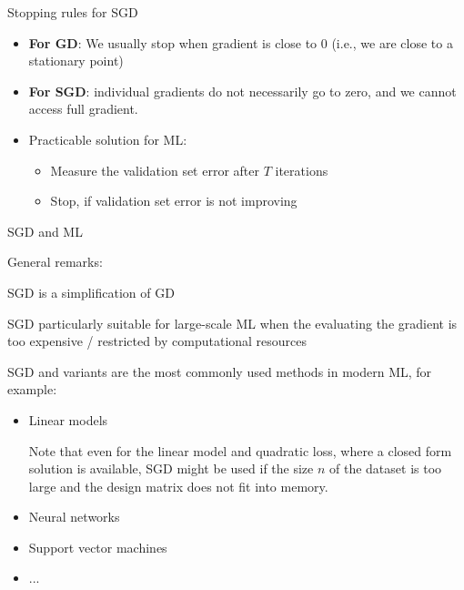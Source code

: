 \documentclass[11pt,compress,t,notes=noshow, xcolor=table]{beamer}
\begin{document}
\begin{vbframe}{Stopping rules for SGD} 

\begin{itemize}
	\item \textbf{For GD}: We usually stop when gradient is close to $0$ (i.e., we are close to a stationary point)
	\item \textbf{For SGD}: individual gradients do not necessarily go to zero, and we cannot access full gradient.
	\item Practicable solution for ML: 
	\begin{itemize}
		\item Measure the validation set error after $T$ iterations
		\item Stop, if validation set error is not improving
	\end{itemize}
\end{itemize}


\end{vbframe}


\begin{vbframe}{SGD and ML}

	\begin{blocki}{General remarks:}
		\item SGD is a simplification of GD 
		\item SGD particularly suitable for large-scale ML when the evaluating the gradient is too expensive / restricted by computational resources
		\item SGD and variants are the most commonly used methods in modern ML, for example:  
		\begin{itemize}
			\item Linear models \\
			\begin{footnotesize}
			Note that even for the linear model and quadratic loss, where a closed form solution is available, SGD might be used if the size $n$ of the dataset is too large and the design matrix does not fit into memory. 			\end{footnotesize}
			\item Neural networks 
			\item Support vector machines
			\item ...
		\end{itemize}
	\end{blocki}

\end{vbframe}
\end{document}
